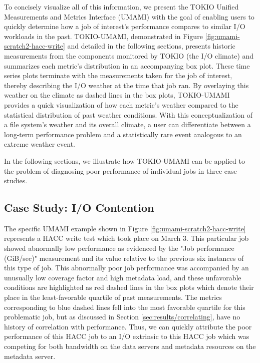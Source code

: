 To concisely visualize all of this information, we present the TOKIO Unified Measurements and Metrics Interface (UMAMI) with the goal of enabling users to quickly determine how a job of interest's performance compares to similar I/O workloads in the past.
TOKIO-UMAMI, demonstrated in Figure \ref{fig:umami-scratch2-hacc-write} and detailed in the following sections, presents historic measurements from the components monitored by TOKIO (the I/O climate) and summarizes each metric's distribution in an accompanying box plot.
These time series plots terminate with the measurements taken for the job of interest, thereby describing the I/O weather at the time that job ran.
By overlaying this weather on the climate as dashed lines in the box plots, TOKIO-UMAMI provides a quick visualization of how each metric's weather compared to the statistical distribution of past weather conditions.
With this conceptualization of a file system's weather and its overall climate, a user can differentiate between a long-term performance problem and a statistically rare event analogous to an extreme weather event.

In the following sections, we illustrate how TOKIO-UMAMI can be applied to the problem of diagnosing poor performance of individual jobs in three case studies.

\subsection{Case Study: I/O Contention}

The specific UMAMI example shown in Figure \ref{fig:umami-scratch2-hacc-write} represents a HACC write test which took place on March 3.
This particular job showed abnormally low performance as evidenced by the "Job performance (GiB/sec)" measurement and its value relative to the previous six instances of this type of job.
This abnormally poor job performance was accompanied by an unusually low coverage factor and high metadata load, and these unfavorable conditions are highlighted as red dashed lines in the box plots which denote their place in the least-favorable quartile of past measurements.
The metrics corresponding to blue dashed lines fell into the most favorable quartile for this problematic job, but as discussed in Section \ref{sec:results/correlating}, have no history of correlation with performance.
Thus, we can quickly attribute the poor performance of this HACC job to an I/O extrinsic to this HACC job which was competing for both bandwidth on the data servers and metadata resources on the metadata server.

